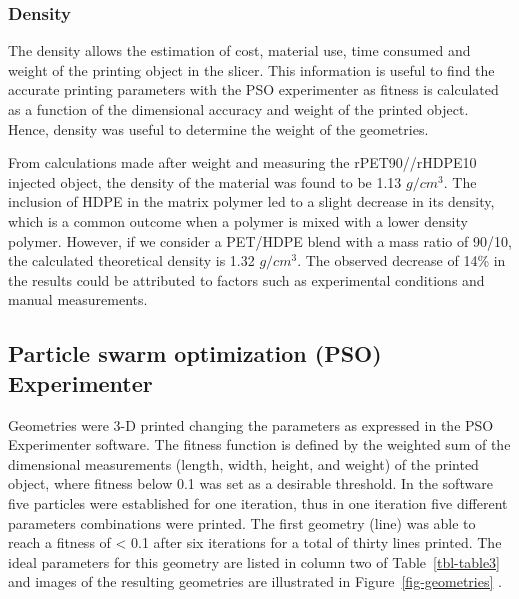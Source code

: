 \documentclass[
  12pt,
]{article}
\begin{document}
\hypertarget{density-1}{%
\subsubsection{Density}\label{density-1}}

The density allows the estimation of cost, material use, time consumed
and weight of the printing object in the slicer. This information is
useful to find the accurate printing parameters with the PSO
experimenter as fitness is calculated as a function of the dimensional
accuracy and weight of the printed object. Hence, density was useful to
determine the weight of the geometries.

From calculations made after weight and measuring the rPET90//rHDPE10
injected object, the density of the material was found to be 1.13
\(g/cm^{3}\). The inclusion of HDPE in the matrix polymer led to a
slight decrease in its density, which is a common outcome when a polymer
is mixed with a lower density polymer. However, if we consider a
PET/HDPE blend with a mass ratio of 90/10, the calculated theoretical
density is 1.32 \(g/cm^{3}\). The observed decrease of 14\% in the
results could be attributed to factors such as experimental conditions
and manual measurements.

\hypertarget{particle-swarm-optimization-pso-experimenter}{%
\subsection{Particle swarm optimization (PSO)
Experimenter}\label{particle-swarm-optimization-pso-experimenter}}

Geometries were 3-D printed changing the parameters as expressed in the
PSO Experimenter software. The fitness function is defined by the
weighted sum of the dimensional measurements (length, width, height, and
weight) of the printed object, where fitness below 0.1 was set as a
desirable threshold. In the software five particles were established for
one iteration, thus in one iteration five different parameters
combinations were printed. The first geometry (line) was able to reach a
fitness of \textless{} 0.1 after six iterations for a total of thirty
lines printed. The ideal parameters for this geometry are listed in
column two of Table~\ref{tbl-table3} and images of the resulting
geometries are illustrated in Figure~\ref{fig-geometries} .
\end{document}
